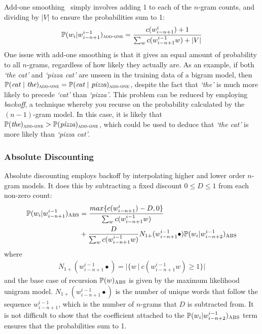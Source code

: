 \documentclass[a4paper, 12pt]{report}
\newcommand{\tit}[1]{\textit{#1}}
\begin{document}
Add-one smoothing~\cite{add1_smoothing:johnson1932} simply involves adding 1 to each of the $n$-gram counts, and dividing by $|V|$ to ensure the probabilities sum to 1:
\begin{gather}
	\mathbb{P}(w_i | w_{i - n + 1}^{i - 1})_{\text{\scshape add-one}} = \frac{c(w_{i - n + 1}^{i}) + 1}{\sum_w c(w_{i - n + 1}^{i - 1}w) + |V|}
\end{gather}
One issue with add-one smoothing is that it gives an equal amount of probability to all $n$-grams, regardless of how likely they actually are. As an example, if both \tit{`the cat'} and \tit{`pizza cat'} are unseen in the training data of a bigram model, then $\mathbb{P}(\tit{cat}\ |\ \tit{the})_{\text{\scshape add-one}} = \mathbb{P}(\tit{cat}\ |\ \tit{pizza})_{\text{\scshape add-one}}$, despite the fact that \tit{`the'} is much more likely to precede \tit{`cat'} than \tit{`pizza'}. This problem can be reduced by employing \tit{backoff}, a technique whereby you recurse on the probability calculated by the $(n - 1)$-gram model. In this case, it is likely that $\mathbb{P}(\tit{the})_{\text{\scshape add-one}} > \mathbb{P}(\tit{pizza})_{\text{\scshape add-one}}$, which could be used to deduce that \tit{`the cat'} is more likely than \tit{`pizza cat'}.

\subsubsection{Absolute Discounting}

Absolute discounting employs backoff by interpolating higher and lower order $n$-gram models. It does this by subtracting a fixed discount $0 \leq D \leq 1$ from each non-zero count:
\begin{equation}
\begin{aligned}
	\mathbb{P}(w_i | w_{i - n + 1}^{i - 1})_{\text{\scshape ABS}} &= \frac{max\{c(w_{i - n + 1}^{i}) - D, 0\}}{\sum_w c(w_{i - n + 1}^{i - 1}w)} \\
	&+ \frac{D}{\sum_w c(w_{i - n + 1}^{i - 1}w)}N_{1+}(w_{i - n + 1}^{i - 1}\bullet)\mathbb{P}(w_i | w_{i - n + 2}^{i - 1})_{\text{\scshape ABS}}
\end{aligned}
\end{equation}
where
\begin{gather} \label{eq:n1plus}
	N_{1+}(w_{i - n + 1}^{i - 1}\bullet) = |\{ w\ |\ c(w_{i - n + 1}^{i - 1}w) \geq 1 \}|
\end{gather}
and the base case of recursion $\mathbb{P}(w)_{\text{\scshape ABS}}$ is given by the maximum likelihood unigram model. $N_{1+}(w_{i - n + 1}^{i - 1}\bullet)$ is the number of unique words that follow the sequence $w_{i - n + 1}^{i - 1}$, which is the number of $n$-grams that $D$ is subtracted from. It is not difficult to show that the coefficient attached to the $\mathbb{P}(w_i | w_{i - n + 2}^{i - 1})_{\text{\scshape ABS}}$ term ensures that the probabilities sum to 1. \\
\end{document}
